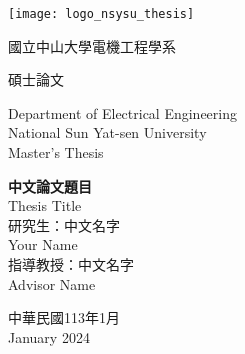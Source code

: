 \thispagestyle{empty}
\begin{center}
  \onehalfspacing
  \texttt{[image: logo\_nsysu\_thesis]}
  
  {\chinnesesize 國立中山大學電機工程學系
    
    碩士論文}
  
  {\bigsize Department of Electrical Engineering\\National Sun Yat-sen University\\}
  {\bigsize Master's Thesis\\}
  
  \vspace{2cm}
  {\chinnesesize \bfseries  中文論文題目\\}
  {\bigsize Thesis Title\\}
  \vspace{2cm}
  {\bigsize \hspace{0pt} 研究生：中文名字\\ %
    \hspace{70pt} Your Name\\ %
    \hspace{0pt} 指導教授：中文名字\\ %
    \hspace{130pt}Advisor Name \\%
  }
  
  \vspace{1.5cm}
  \vfill
  
  {\bigsize 中華民國113年1月\\
    January 2024\\
    
  }
\end{center}


\thispagestyle{empty}
\clearpage
